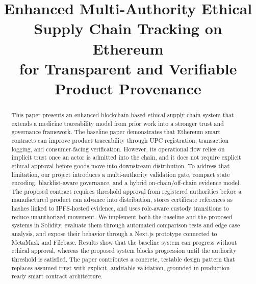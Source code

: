 \documentclass[conference]{IEEEtran}
\begin{document}
\title{Enhanced Multi-Authority Ethical Supply Chain Tracking on Ethereum\\for Transparent and Verifiable Product Provenance}

\author{
\and
{}
\and
{}
}

\maketitle

\begin{abstract}
This paper presents an enhanced blockchain-based ethical supply chain system that extends a medicine traceability model from prior work into a stronger trust and governance framework. The baseline paper demonstrates that Ethereum smart contracts can improve product traceability through UPC registration, transaction logging, and consumer-facing verification. However, its operational flow relies on implicit trust once an actor is admitted into the chain, and it does not require explicit ethical approval before goods move into downstream distribution. To address that limitation, our project introduces a multi-authority validation gate, compact state encoding, blacklist-aware governance, and a hybrid on-chain/off-chain evidence model. The proposed contract requires threshold approval from registered authorities before a manufactured product can advance into distribution, stores certificate references as hashes linked to IPFS-hosted evidence, and uses role-aware custody transitions to reduce unauthorized movement. We implement both the baseline and the proposed systems in Solidity, evaluate them through automated comparison tests and edge case analysis, and expose their behavior through a Next.js prototype connected to MetaMask and Filebase. Results show that the baseline system can progress without ethical approval, whereas the proposed system blocks progression until the authority threshold is satisfied. The paper contributes a concrete, testable design pattern that replaces assumed trust with explicit, auditable validation, grounded in production-ready smart contract architecture.
\end{abstract}
\end{document}

